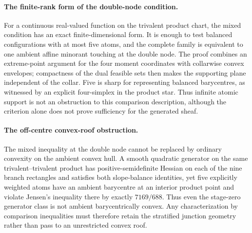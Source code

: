 \paragraph{The finite-rank form of the double-node condition.}
For a continuous real-valued function on the trivalent product chart, the
mixed condition has an exact finite-dimensional form.  It is enough to test
balanced configurations with at most five atoms, and the complete family is
equivalent to one ambient affine minorant touching at the double node.  The
proof combines an extreme-point argument for the four moment coordinates
with collarwise convex envelopes; compactness of the dual feasible sets
then makes the supporting plane independent of the collar.  Five is sharp
for representing balanced barycentres, as witnessed by an explicit
four-simplex in the product star.  Thus infinite atomic support is not an
obstruction to this comparison description, although the criterion alone
does not prove sufficiency for the generated sheaf.




\paragraph{The off-centre convex-roof obstruction.}
The mixed inequality at the double node cannot be replaced by ordinary
convexity on the ambient convex hull.  A smooth quadratic generator on the
same trivalent--trivalent product has positive-semidefinite Hessian on each
of the nine branch rectangles and satisfies both slope-balance identities,
yet five explicitly weighted atoms have an ambient barycentre at an
interior product point and violate Jensen's inequality there by exactly
$7169/688$.  Thus even the stage-zero generator class is not ambient
barycentrically convex.  Any characterization by comparison inequalities
must therefore retain the stratified junction geometry rather than pass to
an unrestricted convex roof.




